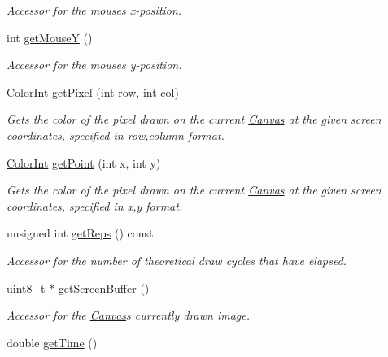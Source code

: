 \begin{DoxyCompactItemize}
\begin{DoxyCompactList}\small\item\em Accessor for the mouse\textquotesingle{}s x-\/position. \end{DoxyCompactList}\item 
int \hyperlink{classtsgl_1_1_canvas_a7fc8592848aaa14c3ff440d0ed3c9e4f}{get\+Mouse\+Y} ()
\begin{DoxyCompactList}\small\item\em Accessor for the mouse\textquotesingle{}s y-\/position. \end{DoxyCompactList}\item 
\hyperlink{structtsgl_1_1_color_int}{Color\+Int} \hyperlink{classtsgl_1_1_canvas_a1f54dba4b09d248e2611f3409353c2c6}{get\+Pixel} (int row, int col)
\begin{DoxyCompactList}\small\item\em Gets the color of the pixel drawn on the current \hyperlink{classtsgl_1_1_canvas}{Canvas} at the given screen coordinates, specified in row,column format. \end{DoxyCompactList}\item 
\hyperlink{structtsgl_1_1_color_int}{Color\+Int} \hyperlink{classtsgl_1_1_canvas_aa31883b3c9b09006cf82b270ad7a0a9f}{get\+Point} (int x, int y)
\begin{DoxyCompactList}\small\item\em Gets the color of the pixel drawn on the current \hyperlink{classtsgl_1_1_canvas}{Canvas} at the given screen coordinates, specified in x,y format. \end{DoxyCompactList}\item 
unsigned int \hyperlink{classtsgl_1_1_canvas_a8f0819f368b41b147f1a7f560a7af6a4}{get\+Reps} () const 
\begin{DoxyCompactList}\small\item\em Accessor for the number of theoretical draw cycles that have elapsed. \end{DoxyCompactList}\item 
uint8\+\_\+t $\ast$ \hyperlink{classtsgl_1_1_canvas_a71f072dd82ca3b5cecfd65cde6d8a226}{get\+Screen\+Buffer} ()
\begin{DoxyCompactList}\small\item\em Accessor for the \hyperlink{classtsgl_1_1_canvas}{Canvas}\textquotesingle{}s currently drawn image. \end{DoxyCompactList}\item 
double \hyperlink{classtsgl_1_1_canvas_aef462ab48e59571b9c88076bbdc8f0b3}{get\+Time} ()

\end{DoxyCompactItemize}

